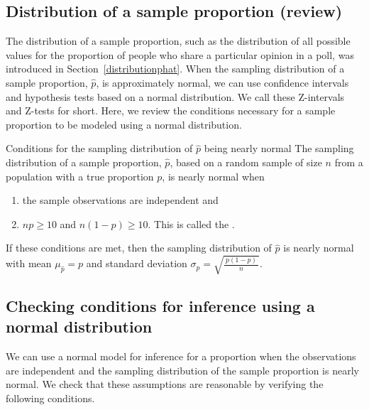 \subsection{Distribution of a sample proportion (review)}

The distribution of a sample proportion, such as the distribution of all possible values for the proportion of people who share a particular opinion in a poll, was introduced in Section~\ref{distributionphat}.  When the sampling distribution of a sample proportion, $\hat{p}$, is approximately normal, we can use confidence intervals and hypothesis tests based on a normal distribution.  We call these Z-intervals and Z-tests for short.  Here, we review the conditions necessary for a sample proportion to be modeled using a normal distribution.

\begin{onebox}{Conditions for the sampling distribution of $\hat{p}$ being nearly normal}
The sampling distribution of a sample proportion, $\hat{p}$, based on a random sample of size $n$ from a population with a true proportion $p$, is nearly normal when
\begin{enumerate}
\item the sample observations are independent and
\item $np\geq10$ and $n(1-p)\geq10$. This is called the .
\end{enumerate}
If these conditions are met, then the sampling distribution of $\hat{p}$ is nearly normal with mean $\mu_{\hat{p}}=p$ and standard deviation $\sigma_{\hat{p}} = \sqrt{\frac{\ p(1-p)\ }{n}}$.\end{onebox}

\subsection{Checking conditions for inference using a normal distribution}
We can use a normal model for inference for a proportion when the observations are independent and the sampling distribution of the sample proportion is nearly normal.  We check that these assumptions are reasonable by verifying the following conditions.

